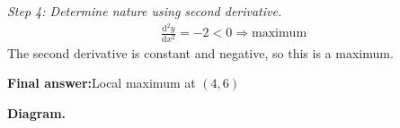 \documentclass[11pt]{article}
\begin{document}
\textit{Step 4: Determine nature using second derivative.}
\[\begin{gathered}
\frac{\mathrm{d}^2y}{\mathrm{d}x^2} = -2 < 0 \Rightarrow \text{maximum}
\end{gathered}\]
The second derivative is constant and negative, so this is a maximum.

\begin{answerbox}
\textbf{Final answer:}\quad Local maximum at \(\displaystyle  (4, 6) \)
\end{answerbox}
\textbf{Diagram.}

\begin{center}
\end{center}
\end{document}

